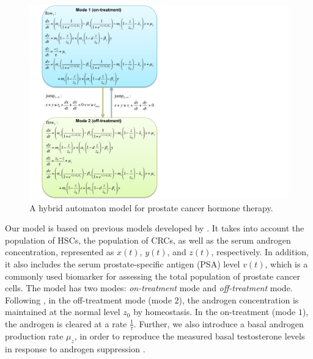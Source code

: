 \begin{figure}[htb]
\centering
\includegraphics[scale=0.6]{fig-prostate}
\caption{A hybrid automaton model for prostate cancer hormone therapy.}
\label{pmodel}
 \vspace{-0.3cm}
\end{figure}

Our model is based on previous models developed by \cite{jackson04a,jackson04b,ideta08}. It takes into account the population of HSCs, the population of CRCs, as well as the serum androgen concentration, represented as $x(t)$, $y(t)$, and $z(t)$, respectively. In addition, it also includes the serum prostate-specific antigen (PSA) level $v(t)$, which is a commonly used biomarker for assessing the total population of prostate cancer cells. The model has two modes: \textit{on-treatment} mode and \textit{off-treatment} mode. Following \cite{ideta08}, in the off-treatment mode (mode $2$), the androgen concentration is maintained at the normal level $z_0$ by homeostasis. In the on-treatment (mode $1$), the androgen is cleared at a rate $\frac{1}{\tau}$. Further, we also introduce a basal androgen production rate $\mu_z$, in order to reproduce the measured basal testosterone levels in response to androgen suppression \cite{bruchovsky06, bruchovsky07}. 

